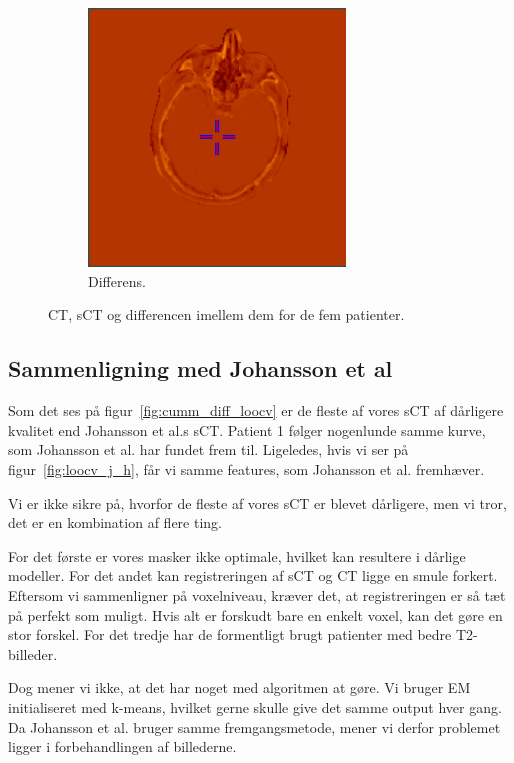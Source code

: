 \begin{figure}
\begin{subfigure}[b]{0.3\textwidth}
        \includegraphics[width=0.75\textwidth]{colager/loocv_ct/loocv_011030_sub.png}
        \caption{Differens.}
        \label{col:loocv_ct_pat5_sub}
    \end{subfigure}
    \caption{CT, sCT og differencen imellem dem for de fem patienter.}
    \label{col:loocv_ct}
\end{figure}

\subsection{Sammenligning med Johansson et al}


Som det ses på figur~\ref{fig:cumm_diff_loocv} er de fleste af vores sCT af dårligere kvalitet end Johansson et al.s sCT. Patient 1 følger nogenlunde samme kurve, som Johansson et al. har fundet frem til. Ligeledes, hvis vi ser på figur~\ref{fig:loocv_j_h}, får vi samme features, som Johansson et al. fremhæver.

Vi er ikke sikre på, hvorfor de fleste af vores sCT er blevet dårligere, men vi tror, det er en kombination af flere ting. 

For det første er vores masker ikke optimale, hvilket kan resultere i dårlige modeller. For det andet kan registreringen af sCT og CT ligge en smule forkert. Eftersom vi sammenligner på voxelniveau, kræver det, at registreringen er så tæt på perfekt som muligt. Hvis alt er forskudt bare en enkelt voxel, kan det gøre en stor forskel. For det tredje har de formentligt brugt patienter med bedre T2-billeder.

Dog mener vi ikke, at det har noget med algoritmen at gøre. Vi bruger EM initialiseret med k-means, hvilket gerne skulle give det samme output hver gang. Da Johansson et al. bruger samme fremgangsmetode, mener vi derfor problemet ligger i forbehandlingen af billederne.

